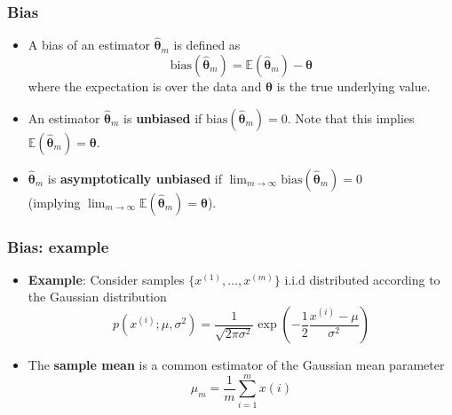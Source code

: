 \documentclass[notes]{beamer}          %
\newcommand{\vect}[1]{\bm{#1}}
\newcommand{\field}[1]{\mathbb{#1}}
\newif\iffull
\begin{document}
\iffull
\begin{frame}
\frametitle{Function estimation}
    \begin{itemize}
         \item In {\bf function estimation}, we assume that there is a (true) function that describes the (approximate) relationship between $\vect{x}$ and $\vect{y}$
        $$\vect{y} = f(\vect{x}) + \vect{\epsilon}$$
        where $\vect{\epsilon}$ is the part of $\vect{y}$ which is not predictable from $\vect{x}$
        \item The goal is to find the {\bf function estimate} ({\bf model}) $\hat{f}$ which is a good approximation of $f$.
        \item The linear regression and polynomial regression can be seen both illustrate scenarios that can be interpreted as either estimating a parameter $\vect{w}$ or estimating a function $\hat{f}$.
    \end{itemize}
\end{frame}
\fi

\begin{frame}
\frametitle{Bias}
    \begin{itemize}
        \item A bias of an estimator $\vect{\hat{\theta}}_m$ is defined as
        $$
        \mbox{bias}(\vect{\hat{\theta}}_m) = \field{E}(\vect{\hat{\theta}}_m) - \vect{\theta}
        $$
        where the expectation is over the data and $\vect{\theta}$ is the true underlying value.
        \item An estimator $\vect{\hat{\theta}}_m$ is {\bf unbiased} if $\mbox{bias}(\vect{\hat{\theta}}_m) = 0$. Note that this implies $\field{E}(\vect{\hat{\theta}}_m) = \vect{\theta}$.
        \item $\vect{\hat{\theta}}_m$ is {\bf asymptotically unbiased} if $\lim_{m \rightarrow \infty} \mbox{bias}(\vect{\hat{\theta}}_m) = 0$ \\
        (implying $\lim_{m \rightarrow \infty} \field{E}(\vect{\hat{\theta}}_m) = \vect{\theta}$).
    \end{itemize}
\end{frame}


\begin{frame}
\frametitle{Bias: example}
    \begin{itemize}
        \item {\bf Example}: Consider samples $\{x^{(1)}, \ldots, x^{(m)}\}$ i.i.d distributed according to the Gaussian distribution
        $$
        p(x^{(i)};\mu, \sigma^2) = \frac{1}{\sqrt{2 \pi \sigma^2}} \exp \left ( -\frac{1}{2} \frac{x^{(i)} - \mu}{\sigma^2} \right )
        $$
        \item The {\bf sample mean} is a common estimator of the Gaussian mean parameter
        $$
        \hat{\mu}_m = \frac{1}{m} \sum_{i=1}^{m}x{(i)}
        $$
    \end{itemize}
\end{frame}
\end{document}
